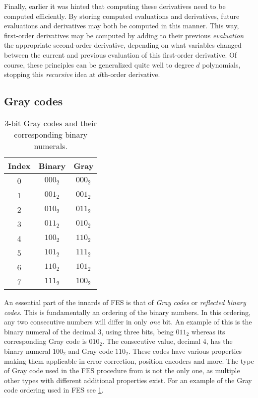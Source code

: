 Finally, earlier it was hinted that computing these derivatives need to be computed efficiently. By storing computed evaluations and derivatives, future evaluations and derivatives may both be computed in this manner. This way, first-order derivatives may be computed by adding to their previous \textit{evaluation} the appropriate second-order derivative, depending on what variables changed between the current and previous evaluation of this first-order derivative. Of course, these principles can be generalized quite well to degree $d$ polynomials, stopping this \textit{recursive} idea at $d$th-order derivative.

\subsection{Gray codes} \label{sec:prereq:fes:gray_codes}

\begin{table}[t]
    \begin{center}
        \begin{tabular}{||c|c|c||}
            \hline
            Index & Binary & Gray \\
            \hline
            0 & $000_2$ & $000_2$\\
            1 & $001_2$ & $001_2$\\
            2 & $010_2$ & $011_2$\\
            3 & $011_2$ & $010_2$\\
            4 & $100_2$ & $110_2$\\
            5 & $101_2$ & $111_2$\\
            6 & $110_2$ & $101_2$\\
            7 & $111_2$ & $100_2$\\
            \hline
        \end{tabular}
    \end{center}
    \caption{3-bit Gray codes and their corresponding binary numerals.} \label{tbl:gray}
\end{table}

An essential part of the innards of FES is that of \textit{Gray codes} or \textit{reflected binary codes}. This is fundamentally an ordering of the binary numbers. In this ordering, any two consecutive numbers will differ in only \textit{one} bit. An example of this is the binary numeral of the decimal 3, using three bits, being $011_2$ whereas its corresponding Gray code is $010_2$.
The consecutive value, decimal 4, has the binary numeral $100_2$ and Gray code $110_2$. These codes have various properties making them applicable in error correction, position encoders and more. The type of Gray code used in the FES procedure from \cite{ches-2010-23990, cryptoeprint:2013/436} is not the only one, as multiple other types with different additional properties exist. For an example of the Gray code ordering used in FES see \cref{tbl:gray}.

